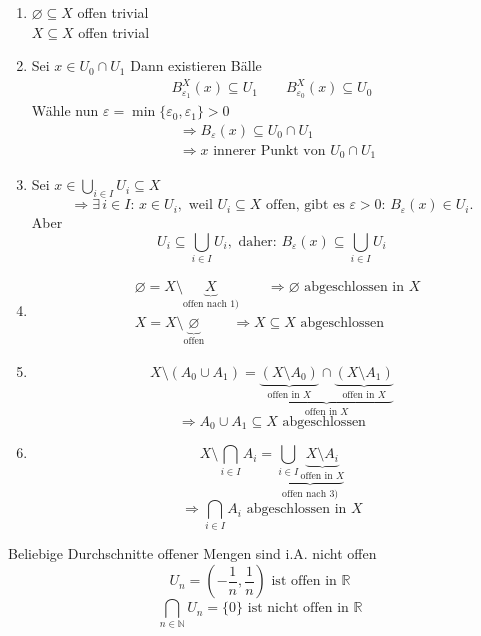 \begin{enumerate}
	\item $\varnothing \subseteq X$ offen trivial \\
		$X \subseteq  X$ offen trivial
	\item Sei $x \in U_0 \cap U_1$ Dann existieren Bälle
	\begin{align*}
		B_{\varepsilon_1}^X(x) \subseteq U_1 \qquad B_{\varepsilon_0}^X(x) \subseteq U_0
	\end{align*}
Wähle nun $\varepsilon= \min \{ \varepsilon_0, \varepsilon_1 \} > 0$
\begin{align*}
	& \Rightarrow B_{\varepsilon}(x) \subseteq U_0 \cap U_1 \\
	& \Rightarrow x \text{ innerer Punkt von } U_0 \cap U_1
\end{align*}
	\item Sei $x \in \bigcup\limits_{i \in I}U_i \subseteq X$
	\[
		\Rightarrow \exists\,i \in I:\, x \in U_i, \text{ weil } U_i \subseteq X \text{ offen, gibt es } \varepsilon>0: \, B_{\varepsilon}(x) \in U_i.
	\]
Aber \[
	U_i \subseteq \bigcup\limits_{i \in I}U_i, \text{ daher: } B_{\varepsilon}(x) \subseteq \bigcup\limits_{i \in I}U_i
	\]
	\item \begin{align*}
		&\varnothing = X \setminus \underset{\text{offen nach 1)}}{\underbrace{X}} \qquad \Rightarrow \varnothing \text{ abgeschlossen in } X \\
		&X = X \setminus \underset{\text{offen}}{\underbrace{\varnothing}} \qquad \Rightarrow X \subseteq X \text{ abgeschlossen}
	\end{align*}
	\item \[
		X \setminus(A_0 \cup A_1)= \underset{\text{offen in $X$}}{\underbrace{\underset{\text{offen in $X$}}{\underbrace{(X \setminus A_0)}}\cap \underset{\text{offen in $X$}}{\underbrace{(X \setminus A_1)}}}}
	\]
	\[
		\Rightarrow A_0 \cup A_1 \subseteq X \text{ abgeschlossen}
	\]
	\item \[
		X \setminus \bigcap\limits_{i \in I}A_i = \underset{\text{offen nach 3)}}{\underbrace{\bigcup\limits_{i \in I}\underset{\text{offen in $X$}}{\underbrace{X \setminus A_i}}}}
	\]
	\[
		\Rightarrow \bigcap\limits_{i \in I}A_i \text{ abgeschlossen in } X
	\]
\end{enumerate}
Beliebige Durchschnitte offener Mengen sind i.A. nicht offen 
\[
	U_n = (-\frac{1}{n},\frac{1}{n}) \text{ ist offen in } \mathbb{R}
\]
\[
	\bigcap\limits_{n \in \mathbb{N}}U_n = \{0\} \text{ ist nicht offen in } \mathbb{R}
\]

